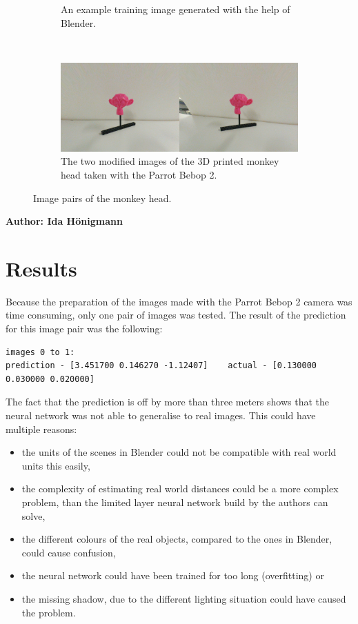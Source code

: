 \begin{figure}[h!]
\begin{subfigure}[t]{\textwidth}
		\caption{An example training image generated with the help of Blender.}
	\end{subfigure}
	~ 
	\begin{subfigure}[t]{\textwidth}
		\centering
		\includegraphics[width=\textwidth]{img/experiment2_environment_comparison_1.jpg}
		\caption{The two modified images of the 3D printed monkey head taken with the Parrot Bebop 2.}
	\end{subfigure}
	\caption{Image pairs of the monkey head.}
	\label{pic:experiment2_environment_comparison}
\end{figure}

\vspace{5mm}
\noindent
\textbf{Author: Ida Hönigmann}

\section{Results}
Because the preparation of the images made with the Parrot Bebop 2 camera was time consuming, only one pair of images was tested. The result of the prediction for this image pair was the following:

\begin{lstlisting}[]
images 0 to 1:
prediction - [3.451700 0.146270 -1.12407]    actual - [0.130000 0.030000 0.020000]
\end{lstlisting}

The fact that the prediction is off by more than three meters shows that the neural network was not able to generalise to real images. This could have multiple reasons:

\begin{itemize}
	\item the units of the scenes in Blender could not be compatible with real world units this easily,
	\item the complexity of estimating real world distances could be a more complex problem, than the limited layer neural network build by the authors can solve,
	\item the different colours of the real objects, compared to the ones in Blender, could cause confusion,
	\item the neural network could have been trained for too long (overfitting) or
	\item the missing shadow, due to the different lighting situation could have caused the problem.
\end{itemize}

\filbreak